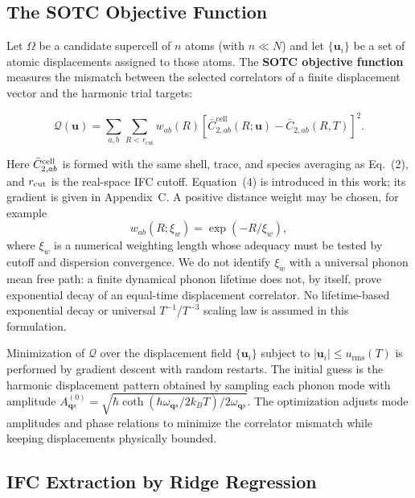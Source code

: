 \documentclass[aps,prb,reprint,amsmath,amssymb,floatfix]{revtex4-2}
\begin{document}
\subsection{The SOTC Objective
Function}\label{the-sotc-objective-function}

Let \(\Omega\) be a candidate supercell of \(n\) atoms (with
\(n \ll N\)) and let \(\{\mathbf{u}_i\}\) be a set of atomic
displacements assigned to those atoms.
The \textbf{SOTC objective function} measures the mismatch between the
selected correlators of a finite displacement vector and the harmonic trial
targets:

\begin{equation}
\mathcal{Q}(\mathbf{u}) = \sum_{a,b}\sum_{R<r_\text{cut}} w_{ab}(R)
\left[\bar{C}_{2,ab}^\text{cell}(R;\mathbf u)
- \bar{C}_{2,ab}(R,T)\right]^2 .
\end{equation}

Here \(\bar C_{2,ab}^{\rm cell}\) is formed with the same shell, trace, and
species averaging as Eq.~(2), and \(r_{\rm cut}\) is the real-space IFC
cutoff. Equation~(4) is introduced in this work; its gradient is given in
Appendix~C. A positive distance weight may be chosen, for example
\begin{equation}
w_{ab}(R;\xi_w)=\exp(-R/\xi_w),
\end{equation}
where \(\xi_w\) is a numerical weighting length whose adequacy must be tested
by cutoff and dispersion convergence. We do not identify \(\xi_w\) with a
universal phonon mean free path: a finite dynamical phonon lifetime does not,
by itself, prove exponential decay of an equal-time displacement correlator.
No lifetime-based exponential decay or universal
\(T^{-1}\)/\(T^{-3}\) scaling law is assumed in this formulation.

Minimization of \(\mathcal{Q}\) over the displacement field
\(\{\mathbf{u}_i\}\) subject to \(|\mathbf{u}_i| \leq u_\text{rms}(T)\)
is performed by gradient descent with random restarts. The initial guess
is the harmonic displacement pattern obtained by sampling each phonon
mode with amplitude
\(A_{\mathbf{q}s}^{(0)} = \sqrt{\hbar\coth(\hbar\omega_{\mathbf{q}s}/2k_BT)/2\omega_{\mathbf{q}s}}\).
The optimization adjusts mode amplitudes and phase relations to minimize
the correlator mismatch while keeping displacements physically bounded.

\subsection{IFC Extraction by Ridge
Regression}\label{ifc-extraction-by-ridge-regression}
\end{document}
